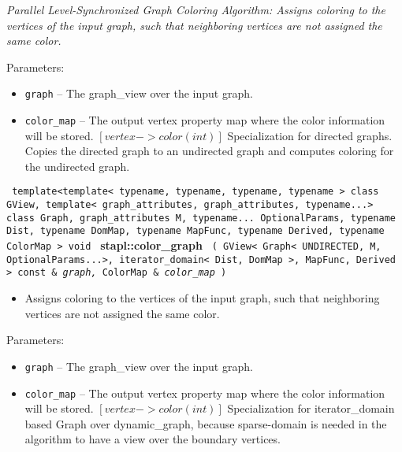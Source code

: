 \textit{
Parallel Level-Synchronized Graph Coloring Algorithm:
Assigns coloring to the vertices of the input graph, such that neighboring vertices are not assigned the same color.
}
\vspace{0.4cm}

Parameters:
\begin{itemize}
\item
\texttt{graph} --
The graph\_view over the input graph.
\item
\texttt{color\_map} --
The output vertex property map where the color information will be stored. 
$[vertex->color (int)]$ 
Specialization for directed graphs. Copies the directed graph to an undirected graph and computes coloring for the undirected graph.
\end{itemize}


\noindent
\texttt{%
template<template< typename, typename, typename, typename > 
\newline
class GView, template< graph\_attributes, graph\_attributes, typename...> 
\newline
class Graph, graph\_attributes M, typename... OptionalParams, 
\newline
typename Dist, typename DomMap, typename MapFunc, typename Derived, typename ColorMap >
\newline
void 
}
\textbf{stapl::color\_graph}%
\newline
\texttt{%
(
GView< Graph< UNDIRECTED, M, OptionalParams...>, iterator\_domain< Dist, DomMap >, MapFunc, Derived > const \&
\textit{graph,}%
ColorMap \&
\textit{color\_map}%
)     
}
\vspace{0.4cm}

\begin{itemize}
\item
Assigns coloring to the vertices of the input graph, such that neighboring vertices are not assigned the same color.
\end{itemize}

Parameters:
\begin{itemize}
\item
\texttt{graph} --
The graph\_view over the input graph.
\item
\texttt{color\_map} --
The output vertex property map where the color information will be stored. 
$[vertex->color (int)]$
Specialization for iterator\_domain based Graph over dynamic\_graph, because sparse-domain is needed in the algorithm to have a view over the boundary vertices.
\end{itemize}

